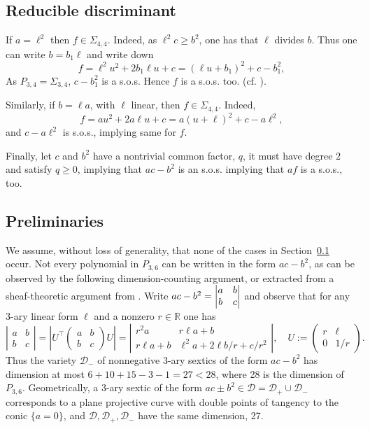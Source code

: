 \documentclass[a4paper,twoside,reqno]{amsart}
\newcommand{\RR}{\mathbb{R}}
\newcommand{\PHF}[2]{P_{{#2},{#1}}}
\newcommand{\SosHF}[2]{\Sigma_{{#2},{#1}}}
\theoremstyle{plain}
\theoremstyle{definition}
\theoremstyle{remark}
\begin{document}
\subsection{Reducible discriminant}\label{rem:easycases}
If $a=\ell^2$ then $f\in\SosHF{4}{4}$.
Indeed, as $\ell^2 c\geq b^2$, one has that $\ell$ divides $b$.
Thus one can write $b=b_1\ell$ and write down
\begin{equation*}
f=\ell^2 u^2+2b_1\ell u+c=(\ell u +b_1)^2+c-b_1^2,
\end{equation*}
As $\PHF{4}{3}=\SosHF{4}{3}$, $c-b_1^2$ is a s.o.s. Hence $f$ is a s.o.s. too.
(cf. \cite[Sect. 2.2]{MR2975385}).

Similarly, if $b=\ell a$, with $\ell$ linear, then
$f\in\SosHF{4}{4}$. Indeed,
\begin{equation*}
f=a u^2+2a\ell u+c=a(u +\ell)^2+c-a\ell^2,
\end{equation*}
and 
$c-a\ell^2$ is s.o.s., implying same for $f$.

Finally, let $c$ and $b^2$ have a nontrivial common factor, $q$, it must
have degree $2$ and satisfy $q\geq 0$, implying that $ac-b^2$ is an s.o.s.
implying that $af$ is a s.o.s., too.



\subsection{Preliminaries}
We assume, without loss of generality, that none of the cases in Section~\ref{rem:easycases} occur.
Not every polynomial in $\PHF{6}{3}$ can be written in the form $ac-b^2$, as can be observed
by the following dimension-counting argument, or extracted from a sheaf-theoretic argument from \cite{MR1786479}. Write
$ac-b^2=\left|\begin{matrix}a&b\cr b&c\end{matrix}\right|$ and observe that for any 3-ary linear form $\ell$
and a nonzero $r\in\RR$ one has
\begin{equation}\label{eq:cong}
\left|\begin{matrix}a&b\\ b&c\end{matrix}\right|=
\left|U^{\top}
\begin{pmatrix}a&b\\ b&c\end{pmatrix}
U\right|=
\left|\begin{matrix}r^2 a& r\ell a+b\\ r\ell a+b&\ell^2 a+2\ell b/r+c/r^2\end{matrix}\right|,\quad U:=\begin{pmatrix}r&\ell\\ 0&1/r\end{pmatrix}.
\end{equation}
Thus the variety $\mathcal{D}_-$ of nonnegative 3-ary sextics of the form $ac-b^2$ has dimension at most
$6+10+15-3-1=27<28$, where 28 is the dimension of $\PHF{6}{3}$.
Geometrically, a 3-ary sextic of the form $ac\pm b^2\in\mathcal{D}=\mathcal{D}_+\cup \mathcal{D}_-$ corresponds to a plane projective curve with double points of tangency to the conic $\{a=0\}$, and $\mathcal{D}, \mathcal{D}_+, \mathcal{D}_-$ have the same dimension, 27.
\end{document}
